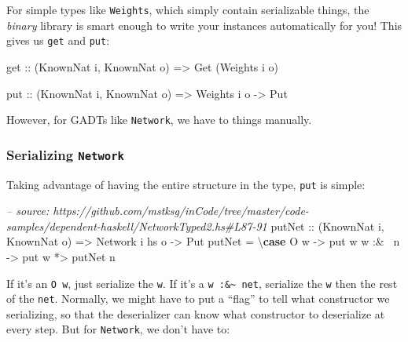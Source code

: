 \documentclass[]{article}
\newenvironment{Shaded}{}{}
\newcommand{\KeywordTok}[1]{\textcolor[rgb]{0.00,0.44,0.13}{\textbf{{#1}}}}
\newcommand{\DataTypeTok}[1]{\textcolor[rgb]{0.56,0.13,0.00}{{#1}}}
\newcommand{\CommentTok}[1]{\textcolor[rgb]{0.38,0.63,0.69}{\textit{{#1}}}}
\newcommand{\OtherTok}[1]{\textcolor[rgb]{0.00,0.44,0.13}{{#1}}}
\newcommand{\FunctionTok}[1]{\textcolor[rgb]{0.02,0.16,0.49}{{#1}}}
\newcommand{\NormalTok}[1]{{#1}}
\begin{document}
For simple types like \texttt{Weights}, which simply contain serializable
things, the \emph{binary} library is smart enough to write your instances
automatically for you! This gives us \texttt{get} and \texttt{put}:

\begin{Shaded}
\begin{Highlighting}[]
\OtherTok{get ::} \NormalTok{(}\DataTypeTok{KnownNat} \NormalTok{i, }\DataTypeTok{KnownNat} \NormalTok{o)}
    \OtherTok{=>} \DataTypeTok{Get} \NormalTok{(}\DataTypeTok{Weights} \NormalTok{i o)}

\OtherTok{put ::} \NormalTok{(}\DataTypeTok{KnownNat} \NormalTok{i, }\DataTypeTok{KnownNat} \NormalTok{o)}
    \OtherTok{=>} \DataTypeTok{Weights} \NormalTok{i o}
    \OtherTok{->} \DataTypeTok{Put}
\end{Highlighting}
\end{Shaded}

However, for GADTs like \texttt{Network}, we have to things manually.

\subsubsection{\texorpdfstring{Serializing
\texttt{Network}}{Serializing Network}}\label{serializing-network}

Taking advantage of having the entire structure in the type, \texttt{put} is
simple:

\begin{Shaded}
\begin{Highlighting}[]
\CommentTok{-- source: https://github.com/mstksg/inCode/tree/master/code-samples/dependent-haskell/NetworkTyped2.hs#L87-91}
\OtherTok{putNet ::} \NormalTok{(}\DataTypeTok{KnownNat} \NormalTok{i, }\DataTypeTok{KnownNat} \NormalTok{o)}
       \OtherTok{=>} \DataTypeTok{Network} \NormalTok{i hs o}
       \OtherTok{->} \DataTypeTok{Put}
\NormalTok{putNet }\FunctionTok{=} \NormalTok{\textbackslash{}}\KeywordTok{case} \DataTypeTok{O} \NormalTok{w     }\OtherTok{->} \NormalTok{put w}
               \NormalTok{w }\FunctionTok{:&~} \NormalTok{n }\OtherTok{->} \NormalTok{put w }\FunctionTok{*>} \NormalTok{putNet n}
\end{Highlighting}
\end{Shaded}

If it's an \texttt{O\ w}, just serialize the \texttt{w}. If it's a
\texttt{w\ :\&\textasciitilde{}\ net}, serialize the \texttt{w} then the rest of
the \texttt{net}. Normally, we might have to put a ``flag'' to tell what
constructor we serializing, so that the deserializer can know what constructor
to deserialize at every step. But for \texttt{Network}, we don't have to:
\end{document}

